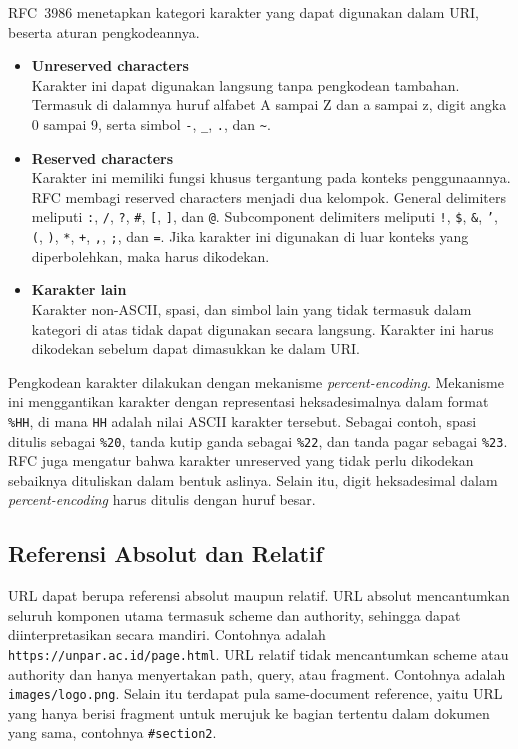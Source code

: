 RFC~3986 menetapkan kategori karakter yang dapat digunakan dalam URI, beserta aturan pengkodeannya.
\begin{itemize}
  \item \textbf{Unreserved characters}\\
  Karakter ini dapat digunakan langsung tanpa pengkodean tambahan. Termasuk di dalamnya huruf alfabet A sampai Z dan a sampai z, digit angka 0 sampai 9, serta simbol \texttt{-}, \texttt{\_}, \texttt{.}, dan \texttt{\textasciitilde}.
  
  \item \textbf{Reserved characters}\\
  Karakter ini memiliki fungsi khusus tergantung pada konteks penggunaannya. RFC membagi reserved characters menjadi dua kelompok. General delimiters meliputi \texttt{:}, \texttt{/}, \texttt{?}, \texttt{\#}, \texttt{[}, \texttt{]}, dan \texttt{@}. Subcomponent delimiters meliputi \texttt{!}, \texttt{\$}, \texttt{\&}, \texttt{'}, \texttt{(}, \texttt{)}, \texttt{*}, \texttt{+}, \texttt{,}, \texttt{;}, dan \texttt{=}. Jika karakter ini digunakan di luar konteks yang diperbolehkan, maka harus dikodekan.
  
  \item \textbf{Karakter lain}\\
  Karakter non-ASCII, spasi, dan simbol lain yang tidak termasuk dalam kategori di atas tidak dapat digunakan secara langsung. Karakter ini harus dikodekan sebelum dapat dimasukkan ke dalam URI.
\end{itemize}

Pengkodean karakter dilakukan dengan mekanisme \textit{percent-encoding}. Mekanisme ini menggantikan karakter dengan representasi heksadesimalnya dalam format \texttt{\%HH}, di mana \texttt{HH} adalah nilai ASCII karakter tersebut. Sebagai contoh, spasi ditulis sebagai \texttt{\%20}, tanda kutip ganda sebagai \texttt{\%22}, dan tanda pagar sebagai \texttt{\%23}. RFC juga mengatur bahwa karakter unreserved yang tidak perlu dikodekan sebaiknya dituliskan dalam bentuk aslinya. Selain itu, digit heksadesimal dalam \textit{percent-encoding} harus ditulis dengan huruf besar.

\subsection{Referensi Absolut dan Relatif}
\label{subsec:0202-referensi-url}

URL dapat berupa referensi absolut maupun relatif. URL absolut mencantumkan seluruh komponen utama termasuk scheme dan authority, sehingga dapat diinterpretasikan secara mandiri. Contohnya adalah \texttt{https://unpar.ac.id/page.html}. URL relatif tidak mencantumkan scheme atau authority dan hanya menyertakan path, query, atau fragment. Contohnya adalah \texttt{images/logo.png}. Selain itu terdapat pula same-document reference, yaitu URL yang hanya berisi fragment untuk merujuk ke bagian tertentu dalam dokumen yang sama, contohnya \texttt{\#section2}.

